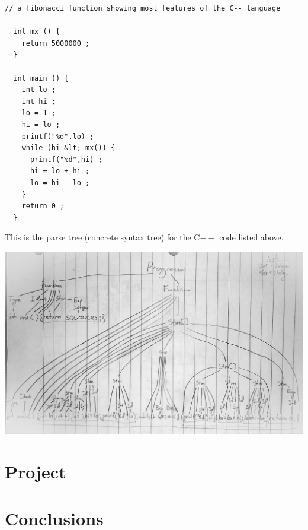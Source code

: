 \documentclass{article}
\theoremstyle{theorem}
\theoremstyle{definition}
\theoremstyle{remark}
\begin{document}
\medskip\noindent
\begin{lstlisting}[style=CStyle]
  // a fibonacci function showing most features of the C-- language

  int mx () {
    return 5000000 ;
  }

  int main () {
    int lo ; 
    int hi ;
    lo = 1 ;
    hi = lo ;
    printf("%d",lo) ;
    while (hi &lt; mx()) {
      printf("%d",hi) ;
      hi = lo + hi ;
      lo = hi - lo ;
    }
    return 0 ;
  }
\end{lstlisting}

\medskip\noindent
This is the parse tree (concrete syntax tree) for the C$--$ code listed above.

\medskip\noindent
\includegraphics[width=1\textwidth]{Images/ConcreteSyntaxTree.jpg}

\section{Project}
 

\section{Conclusions}\label{conclusions}

\begin{thebibliography}{99}

\end{thebibliography}
\end{document}
